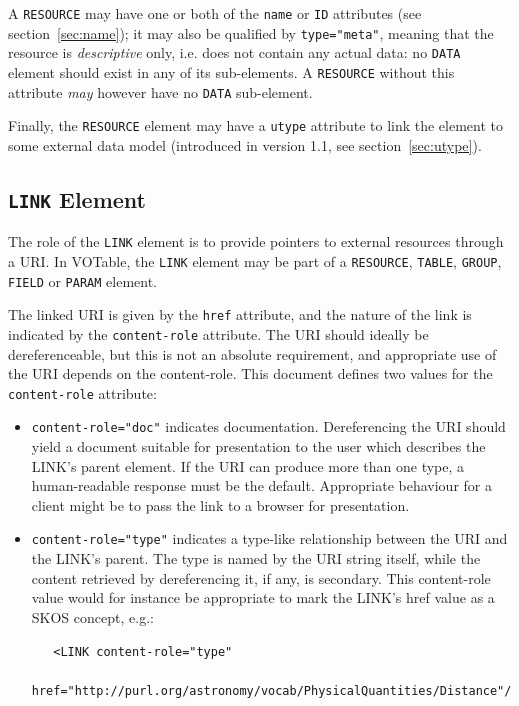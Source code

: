 \documentclass[11pt,a4paper]{ivoa}
\def\Aref#1{section~\ref{#1}}
\let\fg=\color
\def\attr#1{{\tt{\fg{DarkRed}#1}}}
\def\elem#1{{\tt{\fg{DarkRed}#1}}}
\def\attrval#1#2{{\tt{\fg{DarkRed}#1}="{\fg{DarkPurple}#2}"}}
\begin{document}
A \elem{RESOURCE} may have one or both of the \attr{name} or \attr{ID}
attributes (see \Aref{sec:name}); it may also be qualified by
\attrval{type}{meta}, meaning that the resource is {\em descriptive}
only, i.e. does not contain any actual data: no \elem{DATA} element
should exist in any of its sub-elements. A \elem{RESOURCE} without
this attribute {\em may} however have no \elem{DATA} sub-element.

Finally, the \elem{RESOURCE} element may have a \attr{utype} attribute
to link the element to some external data model
(introduced in version 1.1, see \Aref{sec:utype}).

\subsection{\elem{LINK} Element}
\label{sec:link}
\label{elem:LINK}

The role of the {\elem{LINK}} element is to provide pointers
to external resources
through a URI. In VOTable, the {\elem{LINK}}
element may be part of a {\elem{RESOURCE}},
{\elem{TABLE}}, \elem{GROUP}, {\elem{FIELD}} or \elem{PARAM} element.

The linked URI is given by the \attr{href} attribute,
and the nature of the link is indicated by the \attr{content-role} attribute.
The URI should ideally be dereferenceable,
but this is not an absolute requirement,
and appropriate use of the URI depends on the content-role.
This document defines two values for the \attr{content-role} attribute:

\begin{itemize}
\item \attrval{content-role}{doc} indicates documentation.
      Dereferencing the URI should yield a document suitable for
      presentation to the user which describes the LINK's parent element.
      If the URI can produce more than one type, a human-readable response
      must be the default.
      Appropriate behaviour for a client might be to pass the link to a browser
      for presentation.

\item \attrval{content-role}{type} indicates a type-like relationship
      between the URI and the LINK's parent.
      The type is named by the URI string itself,
      while the content retrieved by dereferencing it, if any, is secondary.
      This content-role value would for instance be appropriate
      to mark the LINK's href value as a SKOS concept, e.g.:
      \begin{verbatim}
   <LINK content-role="type"
         href="http://purl.org/astronomy/vocab/PhysicalQuantities/Distance"/>
      \end{verbatim}
\end{itemize}
\end{document}
